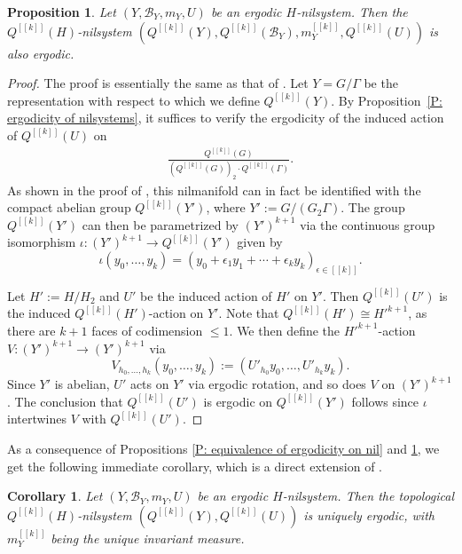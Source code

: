\documentclass[11pt]{amsart}
\newtheorem{corollary}[lemma]{Corollary}
\newtheorem{proposition}[lemma]{Proposition}
\theoremstyle{definition}
\newcommand{\CB}{{\mathcal B}}
\newcommand{\eps}{\epsilon}
\newcommand{\cube}[1]{{[\![#1]\!]}}
\newcommand{\1}{{\mathbf{1}}}
\begin{document}
\begin{proposition}\label{P: ergodicity on cubes}
    Let $(Y, \CB_Y, m_Y, U)$ be an ergodic $H$-nilsystem. Then the $Q^\cube{k}(H)$-nilsystem  
    $(Q^\cube{k}(Y), Q^\cube{k}(\CB_Y), m_Y^\cube{k}, Q^\cube{k}(U))$    is also ergodic.
\end{proposition}
\begin{proof}
    The proof is essentially the same as that of \cite[Chapter 12, Theorem~3]{HK18}. Let $Y=G/\Gamma$ be the representation with respect to which we define $Q^\cube{k}(Y)$. By Proposition~\ref{P: ergodicity of nilsystems}, it suffices to verify the ergodicity of the induced action of $Q^\cube{k}(U)$ on
    \begin{align*}
        \frac{Q^\cube{k}(G)}{(Q^\cube{k}(G))_2\cdot Q^\cube{k}(\Gamma)}.
    \end{align*}
    As shown in the proof of \cite[Chapter 12, Theorem~3]{HK18}, this nilmanifold can in fact be identified with the compact abelian group $Q^\cube{k}(Y')$, where $Y':=G/(G_2\Gamma)$.  The group $Q^\cube{k}(Y')$ can then be parametrized by $(Y')^{k+1}$ via the continuous group isomorphism $\iota: (Y')^{k+1}\to Q^\cube{k}(Y')$ given by $$\iota(y_0, \ldots, y_k)=(y_0 + \eps_1y_1 + \cdots + \eps_k y_k)_{\eps\in\cube{k}}.$$

    Let $H':=H/H_2$ and $U'$ be the induced action of $H'$ on $Y'$. Then $Q^\cube{k}(U')$ is the induced  $Q^\cube{k}(H')$-action on $Y'$.
    Note that $Q^\cube{k}(H')\cong {H'}^{k+1}$, as there are $k+1$ faces of codimension $\leq 1$. We then define the ${H'}^{k+1}$-action $V\colon(Y')^{k+1}\to (Y')^{k+1}$ via $$V_{h_0, \ldots, h_k}(y_0, \ldots, y_k) := (U'_{h_0}y_0 , \ldots, U'_{h_k}y_k).$$ Since $Y'$ is abelian, $U'$ acts on $Y'$ via ergodic rotation, and so does $V$ on $(Y')^{k+1}$. The conclusion that $Q^\cube{k}(U')$ is ergodic on $Q^\cube{k}(Y')$ follows since $\iota$ intertwines $V$ with $Q^\cube{k}(U')$.
\end{proof}

As a consequence of Propositions \ref{P: equivalence of ergodicity on nil} and \ref{P: ergodicity on cubes}, we get the following immediate corollary, which is a direct extension of \cite[Chapter 12, Theorem~3]{HK18}.
\begin{corollary}\label{C: unique ergodicity of cubes}
    Let $(Y, \CB_Y, m_Y, U)$ be an ergodic $H$-nilsystem. Then the topological $Q^\cube{k}(H)$-nilsystem  
    $(Q^\cube{k}(Y), Q^\cube{k}(U))$ is uniquely ergodic, with $m_Y^\cube{k}$ being the unique invariant measure.
\end{corollary}
\end{document}
